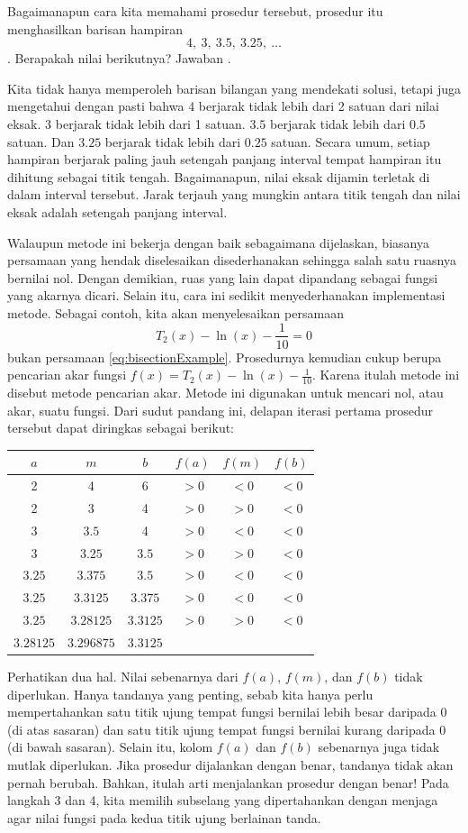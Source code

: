 \noindent Bagaimanapun cara kita memahami prosedur tersebut, prosedur
itu menghasilkan barisan hampiran 
\[
4,\ 3,\ 3.5,\ 3.25,\ \ldots
\]
. Berapakah nilai berikutnya? Jawaban .

Kita tidak hanya memperoleh barisan bilangan yang mendekati solusi,
tetapi juga mengetahui dengan pasti bahwa $4$ berjarak tidak lebih
dari 2 satuan dari nilai eksak. $3$ berjarak tidak lebih dari 1 satuan.
$3.5$ berjarak tidak lebih dari $0.5$ satuan. Dan $3.25$ berjarak
tidak lebih dari $0.25$ satuan. Secara umum, setiap hampiran berjarak
paling jauh setengah panjang interval tempat hampiran itu dihitung
sebagai titik tengah. Bagaimanapun, nilai eksak dijamin terletak di
dalam interval tersebut. Jarak terjauh yang mungkin antara titik tengah
dan nilai eksak adalah setengah panjang interval.

Walaupun metode ini bekerja dengan baik sebagaimana dijelaskan, biasanya
persamaan yang hendak diselesaikan disederhanakan sehingga salah satu
ruasnya bernilai nol. Dengan demikian, ruas yang lain dapat dipandang
sebagai fungsi yang akarnya dicari. Selain itu, cara ini sedikit menyederhanakan
implementasi metode. Sebagai contoh, kita akan menyelesaikan persamaan
\[
T_{2}(x)-\ln(x)-\frac{1}{10}=0
\]
bukan persamaan \ref{eq:bisectionExample}. Prosedurnya kemudian cukup
berupa pencarian akar fungsi $f(x)=T_{2}(x)-\ln(x)-\frac{1}{10}$.
Karena itulah metode ini disebut metode pencarian akar. Metode ini
digunakan untuk mencari nol, atau akar, suatu fungsi. Dari sudut pandang
ini, delapan iterasi pertama prosedur tersebut dapat diringkas sebagai
berikut:

\begin{center}
\begin{tabular}{cccccc}
$a$ & $m$ & $b$ & $f(a)$ & $f(m)$ & $f(b)$\tabularnewline
\hline 
2 & 4 & 6 & $>0$ & $<0$ & $<0$\tabularnewline
2 & 3 & 4 & $>0$ & $>0$ & $<0$\tabularnewline
3 & $3.5$ & 4 & $>0$ & $<0$ & $<0$\tabularnewline
3 & $3.25$ & $3.5$ & $>0$ & $>0$ & $<0$\tabularnewline
$3.25$ & $3.375$ & $3.5$ & $>0$ & $<0$ & $<0$\tabularnewline
$3.25$ & $3.3125$ & $3.375$ & $>0$ & $<0$ & $<0$\tabularnewline
$3.25$ & $3.28125$ & $3.3125$ & $>0$ & $>0$ & $<0$\tabularnewline
$3.28125$ & $3.296875$ & $3.3125$ &  &  & \tabularnewline
\end{tabular}
\par\end{center}

\noindent Perhatikan dua hal. Nilai sebenarnya dari $f(a)$, $f(m)$,
dan $f(b)$ tidak diperlukan. Hanya tandanya yang penting, sebab kita
hanya perlu mempertahankan satu titik ujung tempat fungsi bernilai
lebih besar daripada 0 (di atas sasaran) dan satu titik ujung tempat
fungsi bernilai kurang daripada 0 (di bawah sasaran). Selain itu,
kolom $f(a)$ dan $f(b)$ sebenarnya juga tidak mutlak diperlukan.
Jika prosedur dijalankan dengan benar, tandanya tidak akan pernah
berubah. Bahkan, itulah arti menjalankan prosedur dengan benar! Pada
langkah 3 dan 4, kita memilih subselang yang dipertahankan dengan
menjaga agar nilai fungsi pada kedua titik ujung berlainan tanda. 

